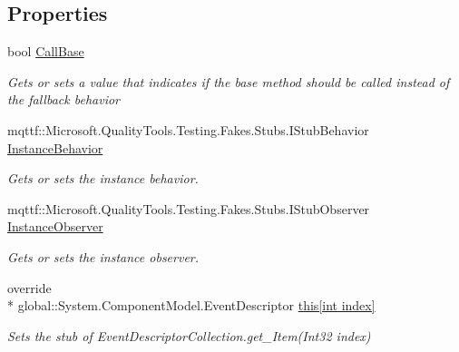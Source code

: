\subsection*{Properties}
\begin{DoxyCompactItemize}
\item 
bool \hyperlink{class_system_1_1_component_model_1_1_fakes_1_1_stub_event_descriptor_collection_a88696dde1705b333e000949a9e5b8185}{Call\-Base}
\begin{DoxyCompactList}\small\item\em Gets or sets a value that indicates if the base method should be called instead of the fallback behavior\end{DoxyCompactList}\item 
mqttf\-::\-Microsoft.\-Quality\-Tools.\-Testing.\-Fakes.\-Stubs.\-I\-Stub\-Behavior \hyperlink{class_system_1_1_component_model_1_1_fakes_1_1_stub_event_descriptor_collection_a8f86020eee5b65cf3433d3e1717af01e}{Instance\-Behavior}
\begin{DoxyCompactList}\small\item\em Gets or sets the instance behavior.\end{DoxyCompactList}\item 
mqttf\-::\-Microsoft.\-Quality\-Tools.\-Testing.\-Fakes.\-Stubs.\-I\-Stub\-Observer \hyperlink{class_system_1_1_component_model_1_1_fakes_1_1_stub_event_descriptor_collection_af46f10e5b61ec7f9483bf61dfdc52b31}{Instance\-Observer}
\begin{DoxyCompactList}\small\item\em Gets or sets the instance observer.\end{DoxyCompactList}\item 
override \\*
global\-::\-System.\-Component\-Model.\-Event\-Descriptor \hyperlink{class_system_1_1_component_model_1_1_fakes_1_1_stub_event_descriptor_collection_a5a326227238c771bbeef087eea21accd}{this\mbox{[}int index\mbox{]}}
\begin{DoxyCompactList}\small\item\em Sets the stub of Event\-Descriptor\-Collection.\-get\-\_\-\-Item(\-Int32 index)\end{DoxyCompactList}\item 

\end{DoxyCompactItemize}
